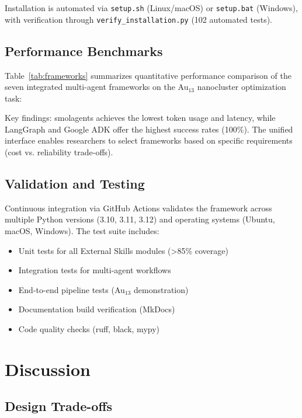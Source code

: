 \documentclass[11pt]{article}
\newcommand{\code}[1]{\texttt{#1}}
\begin{document}
Installation is automated via \code{setup.sh} (Linux/macOS) or \code{setup.bat} (Windows), with verification through \code{verify\_installation.py} (102 automated tests).

\subsection{Performance Benchmarks}

Table~\ref{tab:frameworks} summarizes quantitative performance comparison of the seven integrated multi-agent frameworks on the Au$_{13}$ nanocluster optimization task:



Key findings: smolagents achieves the lowest token usage and latency, while LangGraph and Google ADK offer the highest success rates (100\%). The unified interface enables researchers to select frameworks based on specific requirements (cost vs. reliability trade-offs).

\subsection{Validation and Testing}

Continuous integration via GitHub Actions validates the framework across multiple Python versions (3.10, 3.11, 3.12) and operating systems (Ubuntu, macOS, Windows). The test suite includes:

\begin{itemize}
    \item Unit tests for all External Skills modules (>85\% coverage)
    \item Integration tests for multi-agent workflows
    \item End-to-end pipeline tests (Au$_{13}$ demonstration)
    \item Documentation build verification (MkDocs)
    \item Code quality checks (ruff, black, mypy)
\end{itemize}

\section{Discussion}

\subsection{Design Trade-offs}
\end{document}
